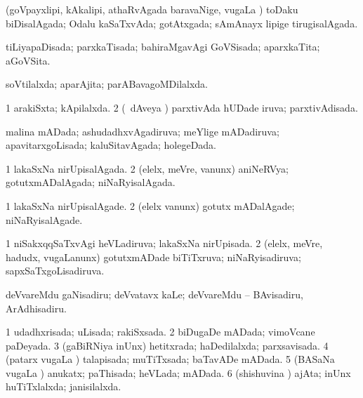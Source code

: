 \bentry
{} 
\gl{\gu}
\expl{}
\bmng
 (goVpayxlipi, kAkalipi, athaRvAgada baravaNige, \mo vugaLa \vi) toDaku biDisalAgada; Odalu kaSaTxvAda; gotAtxgada; sAmAnayx lipige tirugisalAgada. 
\emng
\eentry

\bentry
{} 
\gl{\gu}
\expl{}
\bmng
 tiLiyapaDisada; parxkaTisada; bahiraMgavAgi GoVSisada; aparxkaTita; aGoVSita. 
\emng
\eentry

\bentry
{} 
\gl{\gu}
\expl{}
\bmng
 soVtilalxda; aparAjita; parABavagoMDilalxda. 
\emng
\eentry

\bentry
{} 
\gl{\gu}
\expl{}
\bmng
\bnum
\num{1} arakiSxta; kApilalxda. 
\num{2} (\kanmu\ dAveya \vi) parxtivAda hUDade iruva; parxtivAdisada. 
\enum
\emng
\eentry

\bentry
{} 
\gl{\gu}
\expl{}
\bmng
 malina mADada; ashudadhxvAgadiruva; meYlige mADadiruva; apavitarxgoLisada; kaluSitavAgada; holegeDada. 
\emng
\eentry

\bentry
{} 
\gl{\gu}
\expl{}
\bmng
\bnum
\num{1} lakaSxNa nirUpisalAgada. 
\num{2} (elelx, meVre, \mo vanunx) aniNeRVya; gotutxmADalAgada; niNaRyisalAgada. 
\enum
\emng
\eentry

\bentry
{} 
\gl{\kirxvi}
\expl{}
\bmng
\bnum
\num{1} lakaSxNa nirUpisalAgade. 
\num{2} (elelx \mo vanunx) gotutx mADalAgade; niNaRyisalAgade. 
\enum
\emng
\eentry

\bentry
{} 
\gl{\gu}
\expl{}
\bmng
\bnum
\num{1} niSakxqqSaTxvAgi heVLadiruva; lakaSxNa nirUpisada. 
\num{2} (elelx, meVre, hadudx, \mo vugaLanunx) gotutxmADade biTiTxruva; niNaRyisadiruva; sapxSaTxgoLisadiruva. 
\enum
\emng
\eentry

\bentry
{} 
\gl{\sakirx}
\expl{}
\bmng
 deVvareMdu gaNisadiru; deVvatavx kaLe; deVvareMdu -- BAvisadiru, ArAdhisadiru. 
\emng
\eentry

\bentry
{} 
\gl{\gu}
\expl{}
\bmng
\bnum
\num{1} udadhxrisada; uLisada; rakiSxsada. 
\num{2} biDugaDe mADada; vimoVcane paDeyada. 
\num{3} (gaBiRNiya \vi inUnx) hetitxrada; haDedilalxda; parxsavisada. 
\num{4} (patarx \mo vugaLa \vi) talapisada; muTiTxsada; baTavADe mADada. 
\num{5} (BASaNa \mo vugaLa \vi) anukatx; paThisada; heVLada; mADada. 
\num{6} (shishuvina \vi) ajAta; inUnx huTiTxlalxda; janisilalxda. 
\enum
\emng
\eentry

